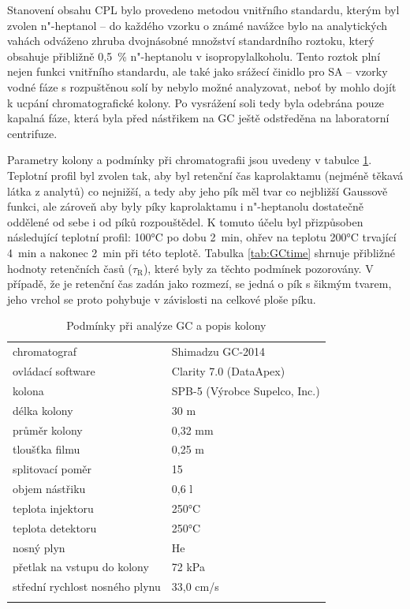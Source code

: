 Stanovení obsahu CPL bylo provedeno metodou vnitřního standardu, kterým byl zvolen n"-heptanol -- do každého vzorku o známé navážce bylo na analytických vahách odváženo zhruba dvojnásobné množství standardního roztoku, který obsahuje přibližně 0,5~\% n"-heptanolu v isopropylalkoholu.
Tento roztok plní nejen funkci vnitřního standardu, ale také jako srážecí činidlo pro SA -- vzorky vodné fáze s rozpuštěnou solí by nebylo možné analyzovat, neboť by mohlo dojít k ucpání chromatografické kolony.
Po vysrážení soli tedy byla odebrána pouze kapalná fáze, která byla před nástřikem na GC ještě odstředěna na laboratorní centrifuze.

Parametry kolony a podmínky při chromatografii jsou uvedeny v tabulce \ref{tab:GC}.
Teplotní profil byl zvolen tak, aby byl retenční čas kaprolaktamu (nejméně těkavá látka z analytů) co nejnižší, a tedy aby jeho pík měl tvar co nejbližší Gaussově funkci, ale zároveň aby byly píky kaprolaktamu i n"-heptanolu dostatečně oddělené od sebe i od píků rozpouštědel.
K tomuto účelu byl přizpůsoben následující teplotní profil: 100°C po dobu 2~min, ohřev na teplotu 200°C trvající 4~min a nakonec 2~min při této teplotě.
Tabulka \ref{tab:GCtime} shrnuje přibližné hodnoty retenčních časů ($\tau_\mathrm{R}$), které byly za těchto podmínek pozorovány.
V případě, že je retenční čas zadán jako rozmezí, se jedná o pík s šikmým tvarem, jeho vrchol se proto pohybuje v závislosti na celkové ploše píku.

\begin{table}[ht]
\caption{Podmínky při analýze GC a popis kolony} \label{tab:GC}
\begin{center}
\begin{tabular}{ll}
	\Xhline{2pt}
	chromatograf & Shimadzu GC-2014\\
	ovládací software & Clarity 7.0 (DataApex)\\
	kolona & SPB-5 (Výrobce Supelco, Inc.)\\
	délka kolony & 30 m\\
	průměr kolony & 0,32 mm\\
	tloušťka filmu & 0,25 \textmu m\\
	splitovací poměr & 15\\
	objem nástřiku & 0,6 \textmu l\\ %
	teplota injektoru & 250°C\\
	teplota detektoru & 250°C\\
	nosný plyn & He\\
	přetlak na vstupu do kolony & 72 kPa\\
	střední rychlost nosného plynu & 33,0 cm/s\\
	\Xhline{2pt}
\end{tabular}
\end{center}
\end{table}

